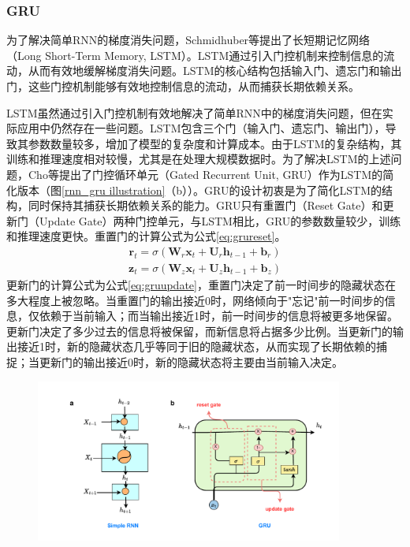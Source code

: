 \subsubsection{GRU}
为了解决简单RNN的梯度消失问题，Schmidhuber等提出了长短期记忆网络（Long Short-Term Memory, LSTM）\cite{schmidhuber1997long}。LSTM通过引入门控机制来控制信息的流动，从而有效地缓解梯度消失问题。LSTM的核心结构包括输入门、遗忘门和输出门，这些门控机制能够有效地控制信息的流动，从而捕获长期依赖关系。

LSTM虽然通过引入门控机制有效地解决了简单RNN中的梯度消失问题，但在实际应用中仍然存在一些问题。LSTM包含三个门（输入门、遗忘门、输出门），导致其参数数量较多，增加了模型的复杂度和计算成本。由于LSTM的复杂结构，其训练和推理速度相对较慢，尤其是在处理大规模数据时。为了解决LSTM的上述问题，Cho等提出了门控循环单元（Gated Recurrent Unit, GRU）作为LSTM的简化版本\cite{choLearningPhraseRepresentations2014}（图\ref{rnn_gru illustration}（b））。GRU的设计初衷是为了简化LSTM的结构，同时保持其捕获长期依赖关系的能力。GRU只有重置门（Reset Gate）和更新门（Update Gate）两种门控单元，与LSTM相比，GRU的参数数量较少，训练和推理速度更快。重置门的计算公式为公式\eqref{eq:grureset}。
\begin{align}
  \mathbf{r}_t = \sigma(\mathbf{W}_r \mathbf{x}_t + \mathbf{U}_r \mathbf{h}_{t-1} + \mathbf{b}_r) \label{eq:grureset}
\end{align}
\begin{align}
  \mathbf{z}_t = \sigma(\mathbf{W}_z \mathbf{x}_t + \mathbf{U}_z \mathbf{h}_{t-1} + \mathbf{b}_z) \label{eq:gruupdate}
\end{align}
更新门的计算公式为公式\eqref{eq:gruupdate}，重置门决定了前一时间步的隐藏状态在多大程度上被忽略。当重置门的输出接近0时，网络倾向于"忘记"前一时间步的信息，仅依赖于当前输入；而当输出接近1时，前一时间步的信息将被更多地保留。
更新门决定了多少过去的信息将被保留，而新信息将占据多少比例。当更新门的输出接近1时，新的隐藏状态几乎等同于旧的隐藏状态，从而实现了长期依赖的捕捉；当更新门的输出接近0时，新的隐藏状态将主要由当前输入决定。
\begin{figure}[htbp]
  \centering
  \includegraphics[width=0.9\textwidth]{Fig/rnn-gru.pdf}
\end{figure}

